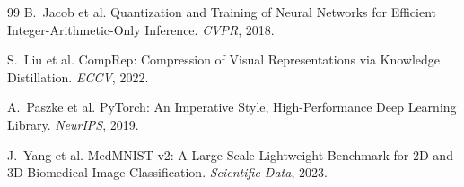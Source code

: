 \documentclass{article}
\begin{document}
\begin{thebibliography}{99}
 B.~Jacob et al. Quantization and Training of Neural Networks for Efficient Integer-Arithmetic-Only Inference. \textit{CVPR}, 2018.

 S.~Liu et al. CompRep: Compression of Visual Representations via Knowledge Distillation. \textit{ECCV}, 2022.

 A.~Paszke et al. PyTorch: An Imperative Style, High-Performance Deep Learning Library. \textit{NeurIPS}, 2019.

 J.~Yang et al. MedMNIST v2: A Large-Scale Lightweight Benchmark for 2D and 3D Biomedical Image Classification. \textit{Scientific Data}, 2023.

\end{thebibliography}
\end{document}
